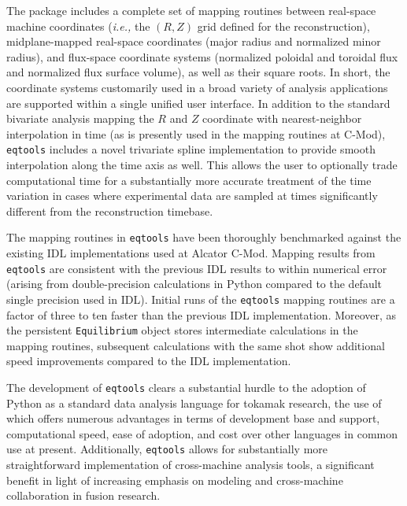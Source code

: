 \documentclass[12pt,floatfix,showpacs]{revtex4-1}
\newcommand{\ie}{\emph{i.e., }}
\newcommand{\eqtools}{\texttt{eqtools}\xspace}
\begin{document}
The package includes a complete set of mapping routines between real-space machine coordinates (\ie the $(R, Z)$ grid defined for the reconstruction), midplane-mapped real-space coordinates (major radius and normalized minor radius), and flux-space coordinate systems (normalized poloidal and toroidal flux and normalized flux surface volume), as well as their square roots.
In short, the coordinate systems customarily used in a broad variety of analysis applications are supported within a single unified user interface.  
In addition to the standard bivariate analysis mapping the $R$ and $Z$ coordinate with nearest-neighbor interpolation in time (as is presently used in the mapping routines at C-Mod), \eqtools includes a novel trivariate spline implementation to provide smooth interpolation along the time axis as well.  
This allows the user to optionally trade computational time for a substantially more accurate treatment of the time variation in cases where experimental data are sampled at times significantly different from the reconstruction timebase.

The mapping routines in \eqtools have been thoroughly benchmarked against the existing IDL implementations used at Alcator C-Mod.  
Mapping results from \eqtools are consistent with the previous IDL results to within numerical error (arising from double-precision calculations in Python compared to the default single precision used in IDL).
Initial runs of the \eqtools mapping routines are a factor of three to ten faster than the previous IDL implementation.
Moreover, as the persistent \verb|Equilibrium| object stores intermediate calculations in the mapping routines, subsequent calculations with the same shot show additional speed improvements compared to the IDL implementation.

The development of \eqtools clears a substantial hurdle to the adoption of Python as a standard data analysis language for tokamak research, the use of which offers numerous advantages in terms of development base and support, computational speed, ease of adoption, and cost over other languages in common use at present.
Additionally, \eqtools allows for substantially more straightforward implementation of cross-machine analysis tools, a significant benefit in light of increasing emphasis on modeling and cross-machine collaboration in fusion research.

\end{document}
